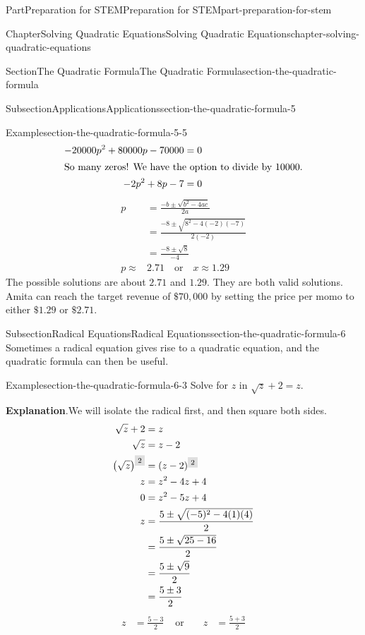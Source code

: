 \documentclass[twoside,10pt,]{book}
\newcommand{\blocktitlefont}{\relax}
\numberwithin{equation}{section}
\newcommand{\highlight}[1]{\mathchoice{\colorbox{lightsapphire}{$\displaystyle #1$}}{\colorbox{lightsapphire}{$\textstyle #1$}}{\colorbox{lightsapphire}{$\scriptstyle #1$}}{\colorbox{lightsapphire}{$\scriptscriptstyle #1$}}}
\newcommand{\amp}{&}
\begin{document}
\begin{partptx}{Part}{Preparation for STEM}{}{Preparation for STEM}{}{}{part-preparation-for-stem}
\begin{chapterptx}{Chapter}{Solving Quadratic Equations}{}{Solving Quadratic Equations}{}{}{chapter-solving-quadratic-equations}
\begin{sectionptx}{Section}{The Quadratic Formula}{}{The Quadratic Formula}{}{}{section-the-quadratic-formula}
\begin{subsectionptx}{Subsection}{Applications}{}{Applications}{}{}{section-the-quadratic-formula-5}
\begin{example}{Example}{}{section-the-quadratic-formula-5-5}
{\begin{align*}
-20000p^2+80000p-70000 \amp = 0\\
\intertext{So many zeros! We have the option to divide by \(10000\).}
-2p^2+8p-7 \amp = 0
\end{align*}
%
\begin{align*}
p\amp=\frac{-b\pm\sqrt{b^2-4ac}}{2a}\\
\amp=\frac{-8\pm\sqrt{8^2-4(-2)(-7)}}{2(-2)}\\
\amp=\frac{-8\pm\sqrt{8}}{-4}\\
p\approx\amp 2.71 \quad\text{or}\quad x\approx1.29
\end{align*}
The possible solutions are about \(2.71\) and \(1.29\). They are both valid solutions. Amita can reach the target revenue of \(\$70{,}000\) by setting the price per momo to either \(\$1.29\) or \(\$2.71\).%
}\end{example}
\end{subsectionptx}
%
%
\typeout{************************************************}
\typeout{************************************************}
%
\begin{subsectionptx}{Subsection}{Radical Equations}{}{Radical Equations}{}{}{section-the-quadratic-formula-6}
Sometimes a radical equation gives rise to a quadratic equation, and the quadratic formula can then be useful.%
\begin{example}{Example}{}{section-the-quadratic-formula-6-3}%
Solve for \(z\) in \(\sqrt{z}+2=z\).%
\par\smallskip%
{\makeatletter{}\makeatother\noindent\textbf{\blocktitlefont Explanation}.\hypertarget{section-the-quadratic-formula-6-3-2}{}\quad{}We will isolate the radical first, and then square both sides.%
\begin{align*}
\sqrt{z}+2\amp=z\\
\sqrt{z}\amp=z-2\\
\left(\sqrt{z}\right)^{\highlight{2}}\amp=(z-2)^{\highlight{2}}\\
z\amp=z^2-4z+4\\
0\amp=z^2-5z+4\\
z\amp=\frac{5\pm\sqrt{(-5)^2-4(1)(4)}}{2}\\
\amp=\frac{5\pm\sqrt{25-16}}{2}\\
\amp=\frac{5\pm\sqrt{9}}{2}\\
\amp=\frac{5\pm3}{2}
\end{align*}
%
\begin{align*}
z\amp=\frac{5-3}{2}\amp\text{ or }\amp\amp z\amp=\frac{5+3}{2}\\

\end{align*}}
\end{example}
\end{subsectionptx}
\end{sectionptx}
\end{chapterptx}
\end{partptx}
\end{document}

